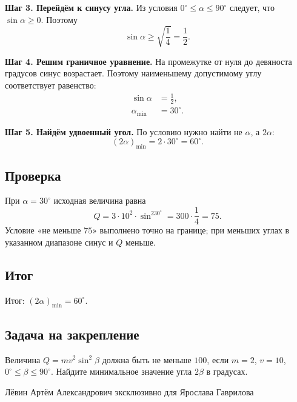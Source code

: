 \documentclass[12pt,a4paper]{article}
\begin{document}
\textbf{Шаг 3. Перейдём к синусу угла.}
Из условия $0^\circ\le\alpha\le90^\circ$ следует, что $\sin\alpha\ge0$. Поэтому
\[
\sin\alpha\ge\sqrt{\frac14}=\frac12.
\]

\textbf{Шаг 4. Решим граничное уравнение.}
На промежутке от нуля до девяноста градусов синус возрастает. Поэтому наименьшему допустимому углу соответствует равенство:
\begin{align*}
\sin\alpha&=\frac12,\\
\alpha_{\min}&=30^\circ.
\end{align*}

\textbf{Шаг 5. Найдём удвоенный угол.}
По условию нужно найти не $\alpha$, а $2\alpha$:
\[
(2\alpha)_{\min}=2\cdot30^\circ=60^\circ.
\]

\subsection*{Проверка}
При $\alpha=30^\circ$ исходная величина равна
\[
Q=3\cdot10^2\cdot\sin^230^\circ
=300\cdot\frac14=75.
\]
Условие «не меньше $75$» выполнено точно на границе; при меньших углах в указанном диапазоне синус и $Q$ меньше.

\subsection*{Итог}
\textcolor{teal!60!black}{Итог:} $\boxed{(2\alpha)_{\min}=60^\circ}$.

\subsection*{Задача на закрепление}
Величина $Q=mv^2\sin^2\beta$ должна быть не меньше $100$, если $m=2$, $v=10$, $0^\circ\le\beta\le90^\circ$. Найдите минимальное значение угла $2\beta$ в градусах.

\vfill
\begin{center}
\small Лёвин Артём Александрович эксклюзивно для Ярослава Гаврилова
\end{center}
\end{document}
